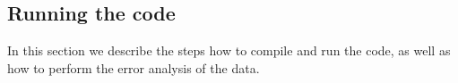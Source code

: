 
%
\subsection{Running the code}\label{sec:running}
%
In this section we describe the steps how to compile and run the code, as well as how to perform the error analysis of the data.
%
